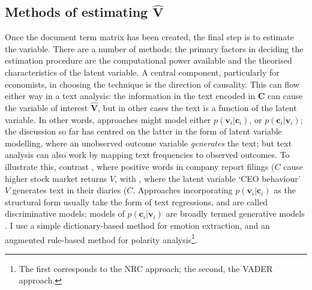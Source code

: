 \documentclass[12pt,a4]{article}
\begin{document}
\subsection{Methods of estimating \(\hat{\mathbf{V}}\)}
Once the document term matrix has been created, the final step is to estimate the variable. There are a number of methods; the primary factors in deciding the estimation procedure are the computational power available and the theorised characteristics of the latent variable. A central component, particularly for economists, in choosing the technique is the direction of causality. This can flow either way in a text analysis: the information in the text encoded in \(\mathbf{C}\) can cause the variable of interest \(\hat{\mathbf{V}}\), but in other cases the text is a function of the latent variable. In other words, approaches might model either \(p(\mathbf{v}_i|\mathbf{c}_i)\), or \(p(\mathbf{c}_i|\mathbf{v}_i)\); the discussion so far has centred on the latter in the form of latent variable modelling, where an unobserved outcome variable \textit{generates} the text; but text analysis can also work by mapping text frequencies to observed outcomes. To illustrate this, contrast \textcite{jegadeeshWordPowerNew2013}, where positive words in company report filings (\(C\) cause higher stock market returns \(V\), with \textcite{bandieraCeoBehaviorFirm2020}, where the latent variable `CEO behaviour' \(V\) generates text in their diaries (\(C\). Approaches incorporating \(p(\mathbf{v}_i|\mathbf{c}_i)\) as the structural form usually take the form of text regressions, and are called discriminative models; models of \(p(\mathbf{c}_i|\mathbf{v}_i)\) are broadly termed generative models \parencite[81]{jurafskySpeechLanguageProcessing2009}.  I use a simple dictionary-based method for emotion extraction, and an augmented rule-based method for polarity analysis\footnote{The first corresponds to the NRC approach; the second, the VADER approach.}.
\end{document}
